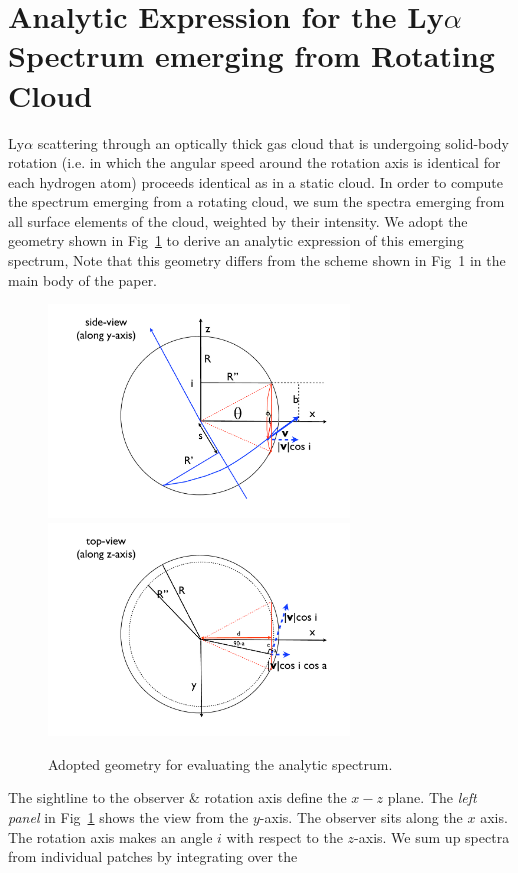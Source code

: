 \section{Analytic Expression for the Ly$\alpha$ Spectrum
emerging from Rotating Cloud}
\label{sec:app}
Ly$\alpha$ scattering through an optically thick gas cloud that is
undergoing solid-body rotation (i.e. in which the angular speed around the
rotation axis is identical for each hydrogen atom) proceeds identical
as in a static cloud. In order to compute the spectrum emerging from a rotating cloud, we sum
the spectra emerging from all surface elements of the cloud, weighted by their intensity.
We adopt the geometry shown in Fig~\ref{fig:scheme} to derive an analytic expression of this emerging spectrum,
Note that this geometry differs from the scheme shown in Fig~1 in the main body of
the paper.
%
\begin{figure}[h]
\centerline{\includegraphics[width=80mm]{../Figures/fig11a.pdf}
\includegraphics[width=80mm]{../Figures/fig11b.pdf}}
\caption[]{Adopted geometry for evaluating the analytic spectrum.}
\label{fig:scheme}
\end{figure}
%
The sightline to the observer \& rotation axis define the $x-z$ plane.
The {\it left panel} in Fig~\ref{fig:scheme} shows the view from the $y$-axis.
The observer sits along the $x$ axis.
The rotation axis makes an angle $i$ with respect to the $z$-axis.
We sum up spectra from individual patches by integrating over the
